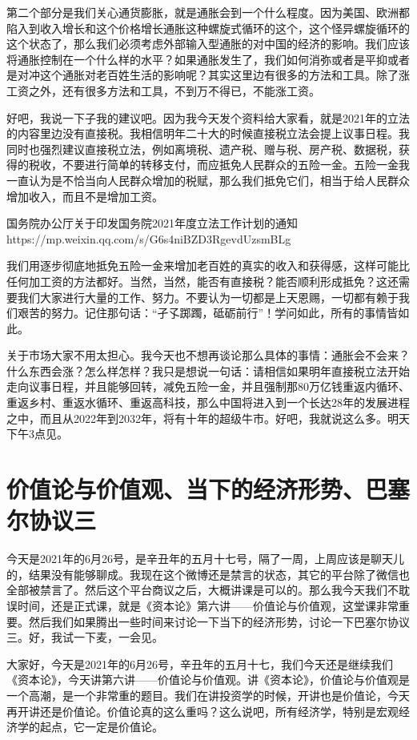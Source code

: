 \documentclass[UTF8, 12pt, a4paper]{ctexrep}
\begin{document}
第二个部分是我们关心通货膨胀，就是通胀会到一个什么程度。因为美国、欧洲都陷入到收入增长和这个价格增长通胀这种螺旋式循环的这个，这个怪异螺旋循环的这个状态了，那么我们必须考虑外部输入型通胀的对中国的经济的影响。我们应该将通胀控制在一个什么样的水平？如果通胀发生了，我们如何消弥或者是平抑或者是对冲这个通胀对老百姓生活的影响呢？其实这里边有很多的方法和工具。除了涨工资之外，还有很多方法和工具，不到万不得已，不能涨工资。

好吧，我说一下子我的建议吧。因为我今天发个资料给大家看，就是2021年的立法的内容里边没有直接税。我相信明年二十大的时候直接税立法会提上议事日程。我同时也强烈建议直接税立法，例如离境税、遗产税、赠与税、房产税、数据税，获得的税收，不要进行简单的转移支付，而应抵免人民群众的五险一金。五险一金我一直认为是不恰当向人民群众增加的税赋，那么我们抵免它们，相当于给人民群众增加收入，而且不是增加工资。

国务院办公厅关于印发国务院2021年度立法工作计划的通知 https://mp.weixin.qq.com/s/G6s4niBZD3RgevdUzsmBLg

我们用逐步彻底地抵免五险一金来增加老百姓的真实的收入和获得感，这样可能比任何加工资的方法都好。当然，当然，能否有直接税？能否顺利形成抵免？这还需要我们大家进行大量的工作、努力。不要认为一切都是上天恩赐，一切都有赖于我们艰苦的努力。记住那句话：“孑孓踯躅，砥砺前行”！学问如此，所有的事情皆如此。

关于市场大家不用太担心。我今天也不想再谈论那么具体的事情：通胀会不会来？什么东西会涨？怎么样怎样？我只是想说一句话：请相信如果明年直接税立法开始走向议事日程，并且能够回转，减免五险一金，并且强制那80万亿钱重返内循环、重返乡村、重返水循环、重返高科技，那么中国将进入到一个长达28年的发展进程之中，而且从2022年到2032年，将有十年的超级牛市。好吧，我就说这么多。明天下午3点见。

\section{价值论与价值观、当下的经济形势、巴塞尔协议三}

今天是2021年的6月26号，是辛丑年的五月十七号，隔了一周，上周应该是聊天儿的，结果没有能够聊成。我现在这个微博还是禁言的状态，其它的平台除了微信也全部被禁言了。然后这个平台商议之后，大概讲课是可以的。那么我今天我们不耽误时间，还是正式课，就是《资本论》第六讲——价值论与价值观，这堂课非常重要。然后我们如果腾出一些时间来讨论一下当下的经济形势，讨论一下巴塞尔协议三。好，我试一下麦，一会见。

大家好，今天是2021年的6月26号，辛丑年的五月十七，我们今天还是继续我们《资本论》，今天讲第六讲——价值论与价值观。讲《资本论》，价值论与价值观是一个高潮，是一个非常重的题目。我们在讲投资学的时候，开讲也是价值论，今天再开讲还是价值论。价值论真的这么重吗？这么说吧，所有经济学，特别是宏观经济学的起点，它一定是价值论。
\end{document}

